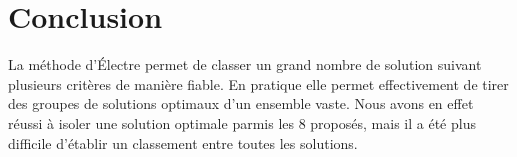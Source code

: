 \section{Conclusion}

La méthode d'Électre  permet de classer un grand nombre de solution suivant plusieurs critères de manière fiable. En pratique elle permet effectivement de tirer des groupes de solutions optimaux d'un ensemble vaste.
Nous avons en effet réussi à isoler une solution optimale parmis les 8 proposés, mais il a été plus difficile d'établir un classement entre toutes les solutions.\\


